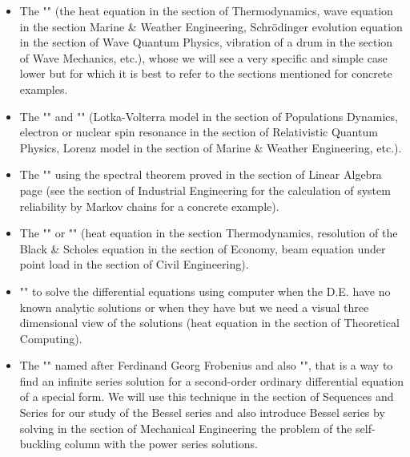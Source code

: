 	\begin{itemize}
		\item The "" (the heat equation in the section of Thermodynamics, wave equation in the section Marine \& Weather Engineering, Schrödinger evolution equation in the section of Wave Quantum Physics, vibration of a drum in the section of Wave Mechanics, etc.), whose we will see a very specific and simple case lower but for which it is best to refer to the sections mentioned for concrete examples.
		
		\item The "" and "" (Lotka-Volterra model in the section of Populations Dynamics, electron or nuclear spin resonance in the section of Relativistic Quantum Physics, Lorenz model in the section of Marine \& Weather Engineering, etc.).
		
		\item The "" using the spectral theorem proved in the section of Linear Algebra page \pageref{spectral theorem} (see the section of Industrial Engineering for the calculation of system reliability by Markov chains for a concrete example).
		
		\item The "" or "" (heat equation in the section Thermodynamics, resolution of the Black \& Scholes equation in the section of Economy, beam equation  under point load in the section of Civil Engineering).
		
		\item "" to solve the differential equations using computer when the D.E. have no known analytic solutions or when they have but we need a visual three dimensional view of the solutions (heat equation in the section of Theoretical Computing).
		
		\item The "" named after Ferdinand Georg Frobenius and  also "", that is a way to find an infinite series solution for a second-order ordinary differential equation of a special form. We will use this technique in the section of Sequences and Series for our study of the Bessel series and also introduce Bessel series by solving in the section of Mechanical Engineering the problem of the self-buckling column with the power series solutions.
	\end{itemize}
